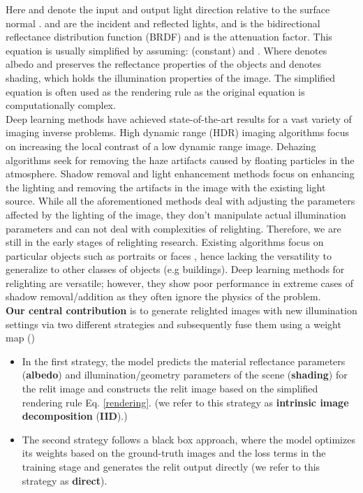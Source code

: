\documentclass[final]{cvpr}
\begin{document}
Here  and  denote the input and output light direction relative to the surface normal .  and  are the incident and reflected lights, and  is the bidirectional reflectance distribution function (BRDF) and  is the attenuation factor. This equation is usually simplified by assuming:  (constant) and .
Where  denotes albedo and preserves the reflectance properties of the objects and  denotes shading, which holds the illumination properties of the image. The simplified equation is often used as the rendering rule as the original equation is computationally complex. 
\\
Deep learning methods have achieved state-of-the-art results for a vast variety of imaging inverse problems. High dynamic range (HDR) imaging algorithms \cite{28,29} focus on increasing the local contrast of a low dynamic range image. Dehazing algorithms \cite{30,31}  seek for removing the haze artifacts caused by floating particles in the atmosphere. Shadow removal \cite{33} and light enhancement \cite{32} methods focus on enhancing the lighting and removing the artifacts in the image with the existing light source. While all the aforementioned methods deal with adjusting the parameters affected by the lighting of the image, they don't manipulate actual illumination parameters and can not deal with complexities of relighting. Therefore, we are still in the early stages of relighting research. Existing algorithms focus on particular objects such as portraits or faces \cite{7,12,6}, hence lacking the versatility to generalize to other classes of objects (e.g buildings). Deep learning methods \cite{40,41,56} for relighting are versatile; however, they show poor performance in extreme cases of shadow removal/addition as they often ignore the physics of the problem. \\
\textbf{Our central contribution} is to generate relighted images with new illumination settings via two different strategies and subsequently fuse them using a weight map ()
\begin{itemize}
    \item In the first strategy, the model predicts the  material reflectance parameters (\textbf{albedo}) and illumination/geometry parameters of the scene (\textbf{shading}) for the relit image and constructs the relit image based on the simplified rendering rule Eq. \ref{rendering}. (we refer to this strategy as \textbf{intrinsic image decomposition} (\textbf{IID}).)
    \item The second strategy follows a black box approach, where the model optimizes its weights based on the ground-truth images and the loss terms in the training stage and generates the relit output directly (we refer to this strategy as \textbf{direct}).
\end{itemize}
\end{document}
